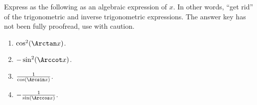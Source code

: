 Express as the following as an algebraic expression of $x$. In other words, ``get rid'' of the trigonometric and inverse trigonometric expressions. The answer key has not been fully proofread, use with caution.

\begin{multicols}{2}
\begin{enumerate}
\item $\cos^2(\Arctan x)$. 
\item $-\sin^2(\Arccot x)$. 
\item $\frac{1}{\cos(\Arcsin x)}$. 
\item $-\frac{1}{\sin(\Arccos x)}$.
\end{enumerate}
\end{multicols}
